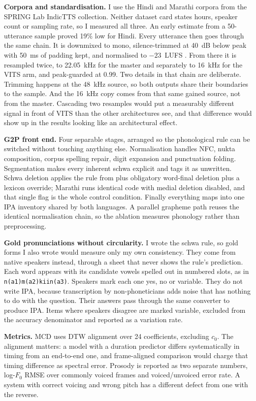 \documentclass[12pt,a4paper]{article}
\begin{document}
\textbf{Corpora and standardisation.} I use the Hindi and Marathi corpora from
the SPRING Lab IndicTTS collection. Neither dataset card states hours, speaker
count or sampling rate, so I measured all three. An early estimate from a
50-utterance sample proved 19\% low for Hindi. Every utterance then goes through the same chain. It is downmixed to mono,
silence-trimmed at 40~dB below peak with 50~ms of padding kept, and normalised
to $-23$~LUFS \cite{itu2015bs1770}. From there it is resampled twice, to
22.05~kHz for the master and separately to 16~kHz for the VITS arm, and
peak-guarded at 0.99. Two details in that chain are deliberate. Trimming happens at the 48~kHz
source, so both outputs share their boundaries to the sample. And the 16~kHz
copy comes from that same gained source, not from the master. Cascading two
resamples would put a measurably different signal in front of VITS than the
other architectures see, and that difference would show up in the results
looking like an architectural effect.

\textbf{G2P front end.} Four separable stages, arranged so the phonological
rule can be switched without touching anything else. Normalisation handles NFC,
nukta composition, corpus spelling repair, digit expansion and punctuation
folding. Segmentation makes every inherent schwa explicit and tags it as
unwritten. Schwa deletion applies the rule from \cite{narasimhan2004schwa} plus
obligatory word-final deletion plus a lexicon override; Marathi runs identical
code with medial deletion disabled, and that single flag is the whole control
condition. Finally everything maps into one IPA inventory shared by both
languages. A parallel grapheme path reuses the identical normalisation chain,
so the ablation measures phonology rather than preprocessing.

\textbf{Gold pronunciations without circularity.} I wrote the schwa rule, so
gold forms I also wrote would measure only my own consistency. They come from
native speakers instead, through a sheet that never shows the rule's
prediction. Each word appears with its candidate vowels spelled out in numbered
slots, as in \texttt{n(a1)m(a2)kiin(a3)}. Speakers mark each one yes, no or
variable. They do not write IPA, because transcription by non-phoneticians adds
noise that has nothing to do with the question. Their answers pass through the same converter
to produce IPA. Items where speakers disagree are marked variable, excluded
from the accuracy denominator and reported as a variation rate.

\textbf{Metrics.} MCD uses DTW alignment over 24 coefficients, excluding
$c_0$. The alignment matters: a model with a duration predictor differs
systematically in timing from an end-to-end one, and frame-aligned comparison
would charge that timing difference as spectral error. Prosody is reported as
two separate numbers, log-$F_0$ RMSE over commonly voiced frames and
voiced/unvoiced error rate. A system with correct voicing and wrong pitch has a
different defect from one with the reverse.
\end{document}
